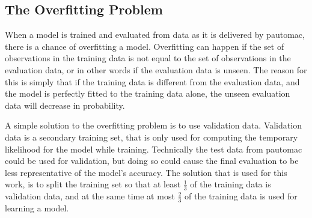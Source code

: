 \subsection{The Overfitting Problem}
When a model is trained and evaluated from data as it is delivered by pautomac, there is a chance of overfitting a model. Overfitting can happen if the set of observations in the training data is not equal to the set of observations in the evaluation data, or in other words if the evaluation data is unseen. The reason for this is simply that if the training data is different from the evaluation data, and the model is perfectly fitted to the training data alone, the unseen evaluation data will decrease in probability.

A simple solution to the overfitting problem is to use validation data. Validation data is a secondary training set, that is only used for computing the temporary likelihood for the model while training. Technically the test data from pautomac could be used for validation, but doing so could cause the final evaluation to be less representative of the model's accuracy. The solution that is used for this work, is to split the training set so that at least $\frac{1}{3}$ of the training data is validation data, and at the same time at most $\frac{2}{3}$ of the training data is used for learning a model.